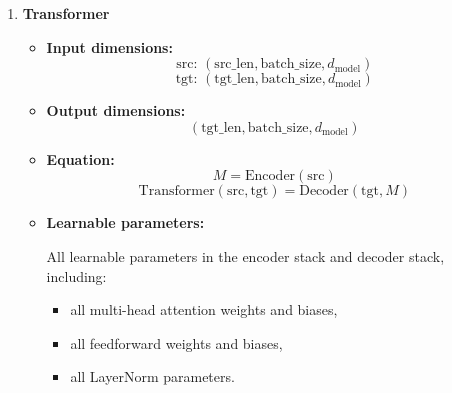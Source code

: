 \documentclass[10pt]{article}
\begin{document}
\begin{enumerate}[label=\roman*.]
\begin{itemize}
    \item \textbf{Input dimensions:}
    \[
    Q:\; (\text{tgt\_len}, \text{batch\_size}, d_{\text{model}})
    \]
    \[
    K,V:\; (\text{src\_len}, \text{batch\_size}, d_{\text{model}})
    \]
    \item \textbf{Output dimensions:}
    \[
    \text{attention output: } (\text{tgt\_len}, \text{batch\_size}, d_{\text{model}})
    \]
    \[
    \text{attention weights: typically } (\text{batch\_size}, \text{tgt\_len}, \text{src\_len})
    \]
    \item \textbf{Equation:}
    \[
    Q_h = QW_h^Q,\qquad K_h = KW_h^K,\qquad V_h = VW_h^V
    \]
    \[
    \mathrm{head}_h = \mathrm{softmax}\left(\frac{Q_hK_h^T}{\sqrt{d_k}}\right)V_h
    \]
    \[
    \mathrm{MHA}(Q,K,V)=\mathrm{Concat}(\mathrm{head}_1,\dots,\mathrm{head}_H)W^O
    \]
    \item \textbf{Learnable parameters:}
    \begin{itemize}
        \item Query projection weights and biases
        \item Key projection weights and biases
        \item Value projection weights and biases
        \item Output projection weight and bias
    \end{itemize}
\end{itemize}

\item \textbf{Transformer}

\begin{itemize}
    \item \textbf{Input dimensions:}
    \[
    \text{src: } (\text{src\_len}, \text{batch\_size}, d_{\text{model}})
    \]
    \[
    \text{tgt: } (\text{tgt\_len}, \text{batch\_size}, d_{\text{model}})
    \]
    \item \textbf{Output dimensions:}
    \[
    (\text{tgt\_len}, \text{batch\_size}, d_{\text{model}})
    \]
    \item \textbf{Equation:}
    \[
    M = \mathrm{Encoder}(\mathrm{src})
    \]
    \[
    \mathrm{Transformer}(\mathrm{src},\mathrm{tgt})=\mathrm{Decoder}(\mathrm{tgt},M)
    \]
    \item \textbf{Learnable parameters:}

    All learnable parameters in the encoder stack and decoder stack, including:
    \begin{itemize}
        \item all multi-head attention weights and biases,
        \item all feedforward weights and biases,
        \item all LayerNorm parameters.
    \end{itemize}
\end{itemize}

\end{enumerate}
\end{document}
